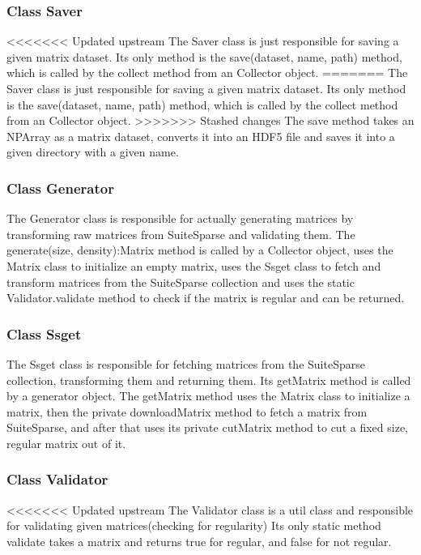 \documentclass[parskip=full]{scrartcl}
\begin{document}
\subsubsection{Class Saver}
<<<<<<< Updated upstream
The Saver class is just responsible for saving a given matrix dataset.
Its only method is the save(dataset, name, path) method, which
is called by the collect method from an Collector object.
=======
The Saver class is just responsible for saving a given matrix dataset. Its only method is the save(dataset, name, path) method, which
is called by the collect method from an Collector object. 
>>>>>>> Stashed changes
The save method takes an NPArray as a matrix dataset, converts it into an HDF5 file and saves it into a given directory with a given name.

\subsubsection{Class Generator}
The Generator class is responsible for actually generating matrices by transforming raw matrices from SuiteSparse and validating them.
The generate(size, density):Matrix method is called by a Collector object, uses the Matrix class to initialize an empty matrix, uses the Ssget class to fetch and transform matrices from the SuiteSparse collection and uses the static Validator.validate method to check if the matrix is regular and can be returned.

\subsubsection{Class Ssget}
The Ssget class is responsible for fetching matrices from the SuiteSparse collection, transforming them and returning them.
Its getMatrix method is called by a generator object.
The getMatrix method uses the Matrix class to initialize a matrix, then the private downloadMatrix method to fetch a matrix from SuiteSparse, and after that uses its private cutMatrix method to cut a fixed size, regular matrix out of it.

\subsubsection{Class Validator}
<<<<<<< Updated upstream
The Validator class is a util class and responsible for validating given matrices(checking for regularity)
 Its only static method validate takes a matrix and returns true for regular, and false for not regular.
\end{document}
